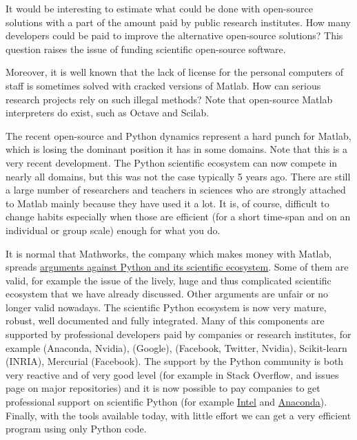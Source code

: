 It would be interesting to estimate what could be done with open-source
solutions with a part of the amount paid by public research institutes. How
many developers could be paid to improve the alternative open-source solutions?
%
This question raises the issue of funding scientific open-source software.

Moreover, it is well known that the lack of license for the personal computers
of staff is sometimes solved with cracked versions of Matlab. How can serious
research projects rely on such illegal methods?
%
Note that open-source Matlab interpreters do exist, such as Octave and Scilab.
%
%

The recent open-source and Python dynamics represent a hard punch for Matlab,
which is losing the dominant position it has in some domains.
%
Note that this is a very recent development. The Python scientific ecosystem can
now compete in nearly all domains, but this was not the case typically 5 years
ago.
%
There are still a large number of researchers and teachers in sciences who are
strongly attached to Matlab mainly because they have used it a lot.
%
It is, of course, difficult to change habits especially when those are efficient
(for a short time-span and on an individual or group scale) enough for what you
do.

It is normal that Mathworks, the company which makes money with Matlab, spreads
\href{https://www.mathworks.com/products/matlab/matlab-vs-python.html}{arguments
against Python and its scientific ecosystem}.  Some of them are valid, for
example the issue of the lively, huge and thus complicated scientific ecosystem
that we have already discussed.  Other arguments are unfair or no longer valid
nowadays.
%
The scientific Python ecosystem is now very mature, robust, well documented and
fully integrated.  Many of this components are supported by professional
developers paid by companies or research institutes, for example 
(Anaconda, Nvidia),  (Google),  (Facebook, Twitter,
Nvidia), Scikit-learn (INRIA), Mercurial (Facebook).
%
The support by the Python community is both very reactive and of very good
level (for example in Stack Overflow, and issues page on major repositories)
and it is now possible to pay companies to get professional support on
scientific Python (for example
\href{https://software.intel.com/en-us/distribution-for-python/get-help}{Intel}
and \href{https://www.anaconda.com/enterprise/}{Anaconda}).
%
Finally, with the tools available today, with little effort we can get a very
efficient program using only Python code.

